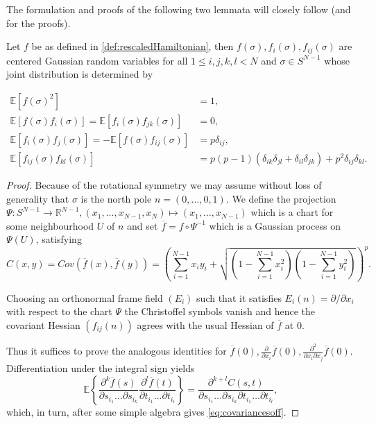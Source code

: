 The formulation and proofs of the following two lemmata will closely follow \cite{Cerny10} (and \cite{Adler07} for the proofs).

\begin{lemma}[Covariances of $f$]
	Let $f$ be as defined in \ref{def:rescaledHamiltonian}, then $f(\sigma),f_i(\sigma),f_{ij}(\sigma)$ are centered Gaussian random variables for all $1\leq i,j,k,l<N$ and $\sigma\in S^{N-1}$ whose joint distribution is determined by
	
	\begin{align}\label{eq:covariancesoff}
		\mathbb E[f(\sigma)^2]&=1,\nonumber\\
		\mathbb E[f(\sigma)f_i(\sigma)]=\mathbb E[f_i(\sigma)f_{jk}(\sigma)]&=0,\nonumber\\
		\mathbb E[f_i(\sigma)f_j(\sigma)]=-\mathbb E[f(\sigma)f_{ij}(\sigma)] &= p\delta_{ij},\nonumber\\
		\mathbb E[f_{ij}(\sigma)f_{kl}(\sigma)] &= p(p-1)(\delta_{ik}\delta_{jl}+\delta_{il}\delta_{jk})+p^2\delta_{ij}\delta_{kl}.
	\end{align}
\end{lemma}

\begin{proof}
	Because of the rotational symmetry we may assume without loss of generality that $\sigma$ is the north pole $n=(0,\dots,0,1)$. We define the projection $\Psi:S^{N-1}\rightarrow\mathbb R^{N-1}, (x_1,\dots,x_{N-1},x_N)\mapsto(x_1,\dots,x_{N-1})$ which is a chart for some neighbourhood $U$ of $n$ and set $\overline f = f\circ\Psi^{-1}$ which is a Gaussian process on $\Psi(U)$, satisfying $$C(x,y)=Cov(\overline f(x),\overline f(y))=\left(\sum_{i=1}^{N-1}x_iy_i + \sqrt{(1-\textstyle\sum_{i=1}^{N-1}x_i^2)(1-\textstyle\sum_{i=1}^{N-1}y_i^2)}\right)^p.$$
	
	Choosing an orthonormal frame field $(E_i)$ such that it satisfies $E_i(n)=\partial/\partial x_i$ with respect to the chart $\Psi$ the Christoffel symbols vanish and hence the covariant Hessian $(f_{ij}(n))$ agrees with the usual Hessian of $\overline f$ at $0$.
	
	Thus it suffices to prove the analogous identities for $\overline f(0),\frac{\partial}{\partial x_i}\overline f(0),\frac{\partial^2}{\partial x_i\partial x_j}\overline f(0)$.
	Differentiation under the integral sign yields 
	\begin{equation}
	\mathbb E\left\{\frac{\partial^k \overline f(s)}{\partial s_{i_1}\dots\partial s_{i_k}} \frac{\partial^l \overline f(t)}{\partial t_{i_1}\dots\partial t_{i_l}}\right\}=\frac{\partial^{k+l} C(s,t)}{\partial s_{i_1}\dots\partial s_{i_k}\partial t_{i_1}\dots\partial t_{i_l}},
	\end{equation}
	which, in turn, after some simple algebra gives \ref{eq:covariancesoff}.
\end{proof}

